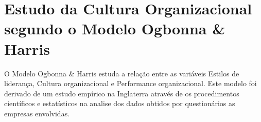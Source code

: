 \newpage
\section{Estudo da Cultura Organizacional segundo o Modelo Ogbonna \& Harris}
\qquad O Modelo Ogbonna \& Harris estuda a relação entre as variáveis Estilos de liderança, Cultura organizacional e Performance organizacional. Este modelo foi derivado de um estudo empírico na Inglaterra através de os procedimentos científicos e estatísticos na analise dos dados obtidos por questionários as empresas envolvidas.\\
